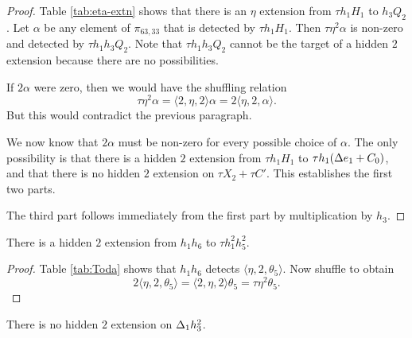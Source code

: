 \begin{proof}
Table \ref{tab:eta-extn} shows that there is an $\eta$
extension from $\tau h_1 H_1$ to $h_3 Q_2$.
Let $\alpha$ be any element of $\pi_{63,33}$ that is
detected by $\tau h_1 H_1$.
Then
$\tau \eta^2 \alpha$ is non-zero and detected by 
$\tau h_1 h_3 Q_2$.
Note that $\tau h_1 h_3 Q_2$ cannot be the target of a hidden
$2$ extension because there are no possibilities.

If $2 \alpha$ were zero, then we would have the shuffling
relation
\[
\tau \eta^2 \alpha =
\langle 2, \eta, 2 \rangle \alpha = 
2 \langle \eta, 2, \alpha \rangle.
\]
But this would contradict the previous paragraph.

We now know that $2 \alpha$ must be non-zero for every possible
choice of $\alpha$.
The only possibility is that there is a hidden
$2$ extension from $\tau h_1 H_1$ to $\tau h_1 (\Delta e_1 + C_0)$,
and that there is no hidden $2$ extension on $\tau X_2 + \tau C'$.
This establishes the first two parts.

The third part follows immediately from the first part by
multiplication by $h_3$.
\end{proof}

\begin{lemma}
\label{lem:2-h1h6}
There is a hidden $2$ extension from $h_1 h_6$ to $\tau h_1^2 h_5^2$.
\end{lemma}

\begin{proof}
Table \ref{tab:Toda} shows that 
$h_1 h_6$ detects $\langle \eta, 2, \theta_5 \rangle$.
Now shuffle to obtain
\[
2 \langle \eta, 2, \theta_5 \rangle =
\langle 2, \eta, 2 \rangle \theta_5 = \tau \eta^2 \theta_5.
\]
\end{proof}

\begin{lemma}
\label{lem:2-D1h3^2}
There is no hidden $2$ extension on $\Delta_1 h_3^2$.
\end{lemma}

